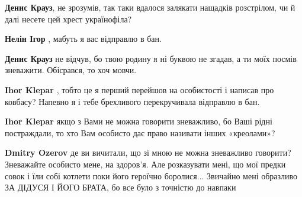 \begin{itemize}
\begin{itemize}
\textbf{Денис Крауз}, не зрозумів, так таки вдалося залякати нащадків розстрілом, чи й далі несете цей хрест українофіла?

 
\textbf{Нелін Ігор} , мабуть я вас відправлю в бан.

 
\textbf{Денис Крауз} не відчув, бо твою родину я ні буквою не згадав, а ти моїх посмів зневажити. Обісрався, то хоч мовчи.

 
\textbf{Ihor Klepar} , тобто це я перший перейшов на особистості і написав про ковбасу?
Напевно я і тебе брехливого перекручивала відправлю в бан.

 
\textbf{Ihor Klepar} якщо з Вами не можна говорити зневажливо, бо Ваші рідні постраждали, то хто Вам особисто дає право називати інших «креолами»?

 
\textbf{Dmitry Ozerov} де ви вичитали, що зі мною не можна зневажливо говорити? Зневажайте особисто мене, на здоров'я. Але розказувати мені, що мої предки совок і їли собі котлети поки його героїчно боролися... Звичайно мені образливо ЗА ДІДУСЯ І ЙОГО БРАТА, бо все було з точністю до навпаки

 

\end{itemize}
\end{itemize}
